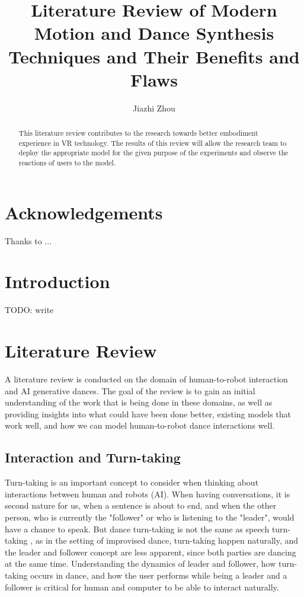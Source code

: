 
\section*{Acknowledgements}

Thanks to ...


\usepackage{amssymb}
\usepackage{cite}



\title{Literature Review of Modern Motion and Dance Synthesis Techniques and Their Benefits and Flaws}
\author{Jiazhi Zhou}
\maketitle

\begin{abstract}

This literature review contributes to the research towards better embodiment experience in VR technology. The results of this review will allow the research team to deploy the appropriate model for the given purpose of the experiments and observe the reactions of users to the model.

\end{abstract}

\section{Introduction}

TODO: write

\section{Literature Review}

A literature review is conducted on the domain of human-to-robot
interaction and AI generative dances. The goal of the review is to gain
an initial understanding of the work that is being done in these
domains, as well as providing insights into what could have been done
better, existing models that work well, and how we can model
human-to-robot dance interactions well.

\subsection{Interaction and Turn-taking}

Turn-taking is an important concept to consider when thinking about
interactions between human and robots (AI). When having conversations,
it is second nature for us, when a sentence is about to end, and when
the other person, who is currently the "follower" or who is listening to
the "leader", would have a chance to speak. But dance turn-taking is not
the same as speech turn-taking \cite{Winston2017}, as in the setting of
improvised dance, turn-taking happen naturally, and the leader and
follower concept are less apparent, since both parties are dancing at
the same time. Understanding the dynamics of leader and follower, how
turn-taking occurs in dance, and how the user performs while being a
leader and a follower is critical for human and computer to be able to
interact naturally.

